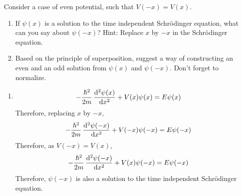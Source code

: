 \documentclass[fleqn, a4paper, 11pt, oneside]{amsart}
\theoremstyle{definition}
\theoremstyle{theorem}
\begin{document}
\begin{question}
	Consider a case of even potential, such that $V(-x) = V(x)$.
	\begin{enumerate}
		\item
			If $\psi(x)$ is a solution to the time independent Schrödinger equation, what can you say about $\psi(-x)$?
			Hint: Replace $x$ by $-x$ in the Schrödinger equation.
		\item
			Based on the principle of superposition, suggest a way of constructing an even and an odd solution from $\psi(x)$ and $\psi(-x)$.
			Don't forget to normalize.
	\end{enumerate}
\end{question}

\begin{solution}
	\begin{enumerate}[leftmargin=*]
		\item
			\begin{align*}
				-\frac{\hbar^2}{2 m} \dod[2]{\psi(x)}{x} + V(x) \psi(x) & = E \psi(x)
			\end{align*}
			Therefore, replacing $x$ by $-x$,
			\begin{align*}
				-\frac{\hbar^2}{2 m} \dod[2]{\psi(-x)}{x} + V(-x) \psi(-x) & = E \psi(-x)
			\end{align*}
			Therefore, as $V(-x) = V(x)$,
			\begin{align*}
				-\frac{\hbar^2}{2 m} \dod[2]{\psi(-x)}{x} + V(x) \psi(-x) & = E \psi(-x)
			\end{align*}
			Therefore, $\psi(-x)$ is also a solution to the time independent Schrödinger equation.
	\end{enumerate}
\end{solution}
\end{document}
